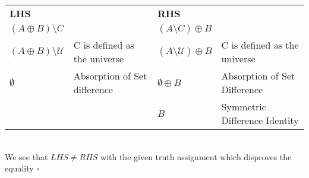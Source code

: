 \documentclass{article}
\begin{document}
  \begin{table}[ht]
     \centering
     \begin{tabular}{llll}
     \textbf{LHS} & &  \textbf{RHS}&\\
   $(A\oplus B)\setminus C$&&$(A\setminus C)\oplus B$  &\\
   
   $(A\oplus B)\setminus \mathcal{U}$ & C is defined as the universe & $(A\setminus \mathcal{U})\oplus B$ & C is defined as the universe \\
   
   $\emptyset$ & Absorption of Set difference & $\emptyset\oplus B$& Absorption of Set Difference \\
   
   &&$B$ & Symmetric Difference Identity\\
     \end{tabular}
 \end{table}
  \\
  We see that $LHS \neq RHS$ with the given truth assignment which disproves the equality $\square$
\end{document}
